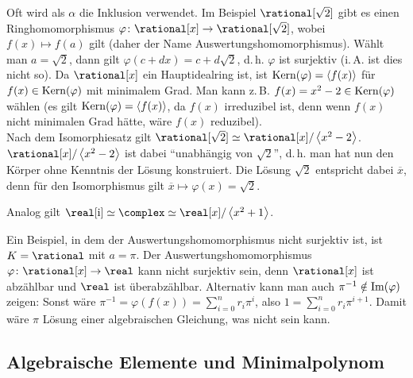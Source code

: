 \linie

\begin{Bsp}
    Oft wird als $\alpha$ die Inklusion verwendet.
    Im Beispiel $\rational[\sqrt{2}]$ gibt es einen Ringhomomorphismus
    $\varphi\colon \rational[x] \rightarrow \rational[\sqrt{2}]$, wobei
    $f(x) \mapsto f(a)$ gilt
    (daher der Name Auswertungshomomorphismus).
    Wählt man $a = \sqrt{2}$, dann gilt $\varphi(c + dx) = c + d\sqrt{2}$,
    d.\,h. $\varphi$ ist surjektiv (i.\,A. ist dies nicht so).
    Da $\rational[x]$ ein Hauptidealring ist, ist
    $\operatorname{Kern}(\varphi) = \left\langle f(x)\right\rangle$ für $f(x) \in \operatorname{Kern}(\varphi)$ mit
    minimalem Grad.
    Man kann z.\,B. $f(x) = x^2 - 2 \in \operatorname{Kern}(\varphi)$ wählen
    (es gilt $\operatorname{Kern}(\varphi) = \left\langle f(x)\right\rangle$, da $f(x)$ irreduzibel ist,
    denn wenn $f(x)$ nicht minimalen Grad hätte, wäre $f(x)$ reduzibel).\\
    Nach dem Isomorphiesatz gilt
    $\rational[\sqrt{2}] \simeq \rational[x]/\erzeugnis{x^2 - 2}$.
    $\rational[x]/\erzeugnis{x^2 - 2}$ ist dabei "`unabhängig von $\sqrt{2}$"',
    d.\,h. man hat nun den Körper ohne Kenntnis der Lösung konstruiert.
    Die Lösung $\sqrt{2}$ entspricht dabei $\overline{x}$,
    denn für den Isomorphismus gilt
    $\overline{x} \mapsto \varphi(x) = \sqrt{2}$.
\end{Bsp}

\begin{Bsp}
    Analog gilt $\real[\i] \simeq \complex \simeq
    \real[x]/\erzeugnis{x^2 + 1}$.
\end{Bsp}

\begin{Bsp}
    Ein Beispiel, in dem der Auswertungshomomorphismus nicht surjektiv ist,
    ist $K = \rational$ mit $a = \pi$.
    Der Auswertungshomomorphismus
    $\varphi\colon \rational[x] \rightarrow \real$ kann nicht surjektiv sein,
    denn $\rational[x]$ ist abzählbar und $\real$ ist überabzählbar.
    Alternativ kann man auch $\pi^{-1} \notin \operatorname{Im}(\varphi)$ zeigen:
    Sonst wäre $\pi^{-1} = \varphi(f(x)) = \sum_{i=0}^n r_i \pi^i$, also
    $1 = \sum_{i=0}^n r_i \pi^{i+1}$.
    Damit wäre $\pi$ Lösung einer algebraischen Gleichung, was nicht sein kann.
\end{Bsp}

\pagebreak

\subsection{%
    Algebraische Elemente und Minimalpolynom%
}

